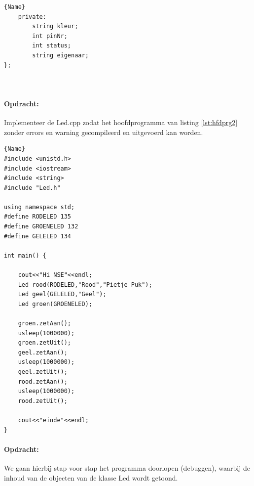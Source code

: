 \begin{enumerate}
\begin{itemize}
\begin{minipage}{.45\textwidth}
\begin{lstlisting}[caption=LED declaratie file(.h),frame=tlrb,label={lst:ledH}]{Name}
	private:
		string kleur;
		int pinNr;
		int status;  
		string eigenaar;
};
		
		
	\end{lstlisting}
	
\end{minipage}

\newpage	
\paragraph{Opdracht:} Implementeer de Led.cpp zodat het hoofdprogramma van listing \ref{lst:hfdprg2} zonder errors en warning gecompileerd en uitgevoerd kan worden. 
\begin{lstlisting}[caption=Hoofdprogramma om de LED uit te testen ,frame=tlrb, label={lst:hfdprg2}]{Name}
#include <unistd.h>
#include <iostream>
#include <string>
#include "Led.h"

using namespace std;
#define RODELED 135
#define GROENELED 132
#define GELELED 134

int main() {
	
	cout<<"Hi NSE"<<endl;
	Led rood(RODELED,"Rood","Pietje Puk");
	Led geel(GELELED,"Geel");
	Led groen(GROENELED);
	
	groen.zetAan();
	usleep(1000000);
	groen.zetUit();
	geel.zetAan();
	usleep(1000000);
	geel.zetUit();
	rood.zetAan();
	usleep(1000000);  
	rood.zetUit();
	
	cout<<"einde"<<endl;
}

\end{lstlisting}	
\end{itemize}
\end{enumerate}

\paragraph{Opdracht:}
We gaan hierbij stap voor stap het programma doorlopen (debuggen), waarbij de inhoud van de objecten van de klasse Led wordt getoond.

